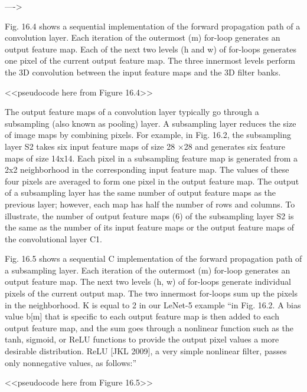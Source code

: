 \documentclass[7pt]{article}
\begin{document}


---->


Fig. 16.4 shows a sequential implementation of the forward propagation path of a convolution layer. Each iteration of the outermost (m) for-loop generates an output feature map. Each of the next two levels (h and w) of for-loops generates one pixel of the current output feature map. The three innermost levels perform the 3D convolution between the input feature maps and the 3D filter banks.

<<pseudocode here from Figure 16.4>>

The output feature maps of a convolution layer typically go through a subsampling (also known as pooling) layer. A subsampling layer reduces the size of image maps by combining pixels. For example, in Fig. 16.2, the subsampling layer S2 takes six input feature maps of size 28 ×28 and generates six feature maps of size 14x14. Each pixel in a subsampling feature map is generated from a 2x2 neighborhood in the corresponding input feature map. The values of these four pixels are averaged to form one pixel in the output feature map. The output of a subsampling layer has the same number of output feature maps as the previous layer; however, each map has half the number of rows and columns. To illustrate, the number of output feature maps (6) of the subsampling layer S2 is the same as the number of its input feature maps or the output feature maps of the convolutional layer C1.

Fig. 16.5 shows a sequential C implementation of the forward propagation path of a subsampling layer. Each iteration of the outermost (m) for-loop generates an output feature map. The next two levels (h, w) of for-loops generate individual pixels of the current output map. The two innermost for-loops sum up the pixels in the neighborhood. K is equal to 2 in our LeNet-5 example “in Fig. 16.2. A bias value b[m] that is specific to each output feature map is then added to each output feature map, and the sum goes through a nonlinear function such as the tanh, sigmoid, or ReLU functions to provide the output pixel values a more desirable distribution. ReLU [JKL 2009], a very simple nonlinear filter, passes only nonnegative values, as follows:”

<<pseudocode here from Figure 16.5>>
\end{document}
